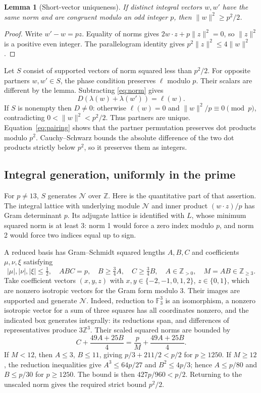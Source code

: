 \documentclass[11pt]{amsart}
\newcommand{\Z}{\mathbb Z}
\newcommand{\F}{\mathbb F}
\newcommand{\norm}[1]{\lVert#1\rVert}
\newtheorem{lemma}[theorem]{Lemma}
\theoremstyle{definition}
\begin{document}
\begin{lemma}[Short-vector uniqueness]
If distinct integral vectors $w,w'$ have the same norm and are congruent
modulo an odd integer $p$, then $\norm{w}^2\ge p^2/2$.
\end{lemma}
\begin{proof}
Write $w'-w=pz$. Equality of norms gives
$2w\cdot z+p\norm{z}^2=0$, so $\norm{z}^2$ is a positive even integer.
The parallelogram identity gives $p^2\norm{z}^2\le4\norm{w}^2$.
\end{proof}

Let $S$ consist of supported vectors of norm squared less than $p^2/2$.
For opposite partners $w,w'\in S$, the phase condition preserves
$\ell$ modulo $p$. Their scalars are different by the lemma. Subtracting
\eqref{eq:norm} gives
\[
 D(\lambda(w)+\lambda(w'))=\ell(w).
\]
If $S$ is nonempty then $D\ne0$: otherwise $\ell(w)=0$ and
$\norm{w}^2/p\equiv0\pmod p$, contradicting
$0<\norm{w}^2<p^2/2$.
Thus partners are unique. Equation~\eqref{eq:pairing} shows that the
partner permutation preserves dot products modulo $p^2$.
Cauchy--Schwarz bounds the absolute difference of the two dot products
strictly below $p^2$, so it preserves them as integers.

\subsection{Integral generation, uniformly in the prime}
For $p\ne13$, $S$ generates $\mathcal N$ over $\Z$.
Here is the quantitative part of that assertion.
The integral lattice with underlying module $\mathcal N$ and inner
product $(w\cdot z)/p$ has Gram determinant $p$. Its adjugate lattice
is identified with $L$, whose minimum squared norm is at least 3:
norm 1 would force a zero index modulo $p$, and norm 2 would force two
indices equal up to sign.

A reduced basis has Gram--Schmidt squared lengths $A,B,C$ and
coefficients $\mu,\nu,\xi$ satisfying
\[
 |\mu|,|\nu|,|\xi|\le\tfrac12,\quad ABC=p,\quad
 B\ge\tfrac34A,\quad C\ge\tfrac34B,\quad
 A\in\Z_{>0},\quad M=AB\in\Z_{\ge3}.
\]
Take coefficient vectors $(x,y,z)$ with $x,y\in\{-2,-1,0,1,2\}$,
$z\in\{0,1\}$, which are nonzero isotropic vectors for the Gram form
modulo 3. Their images are supported and generate $\mathcal N$.
Indeed, reduction to $\F_3^3$ is an isomorphism, a nonzero isotropic
vector for a sum of three squares has all coordinates nonzero, and
the indicated box generates integrally: its reductions span, and
differences of representatives produce $3\Z^3$.
Their scaled squared norms are bounded by
\[
 C+\frac{49A+25B}{4}=\frac pM+\frac{49A+25B}{4}.
\]
If $M<12$, then $A\le3$, $B\le11$, giving $p/3+211/2<p/2$
for $p\ge1250$. If $M\ge12$, the reduction inequalities give
$A^3\le64p/27$ and $B^2\le4p/3$; hence $A\le p/80$ and
$B\le p/30$ for $p\ge1250$. The bound is then
$427p/960<p/2$. Returning to the unscaled norm gives the required
strict bound $p^2/2$.
\end{document}
